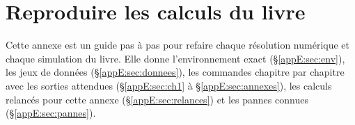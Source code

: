 \ifdefined\chemin\else
{}
\DeclareUrlCommand{}
\DeclareUrlCommand{}
\fi
\chapter{Reproduire les calculs du livre}\label{appE:chap}
\sloppy %

Cette annexe est un guide pas à pas pour refaire chaque résolution numérique et chaque simulation du livre. Elle
donne l'environnement exact (§\ref{appE:sec:env}), les jeux de données (§\ref{appE:sec:donnees}), les commandes
chapitre par chapitre avec les sorties attendues (§\ref{appE:sec:ch1} à §\ref{appE:sec:annexes}), les calculs relancés
pour cette annexe (§\ref{appE:sec:relances}) et les pannes connues (§\ref{appE:sec:pannes}).

